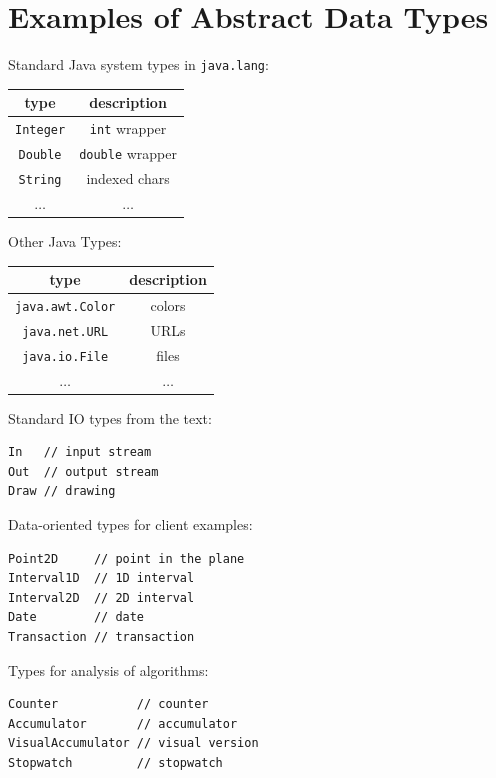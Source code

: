 \documentclass[8pt,a4paper,compress]{beamer}
\begin{document}
\section{Examples of Abstract Data Types}
\begin{frame}[fragile]
Standard Java system types in \lstinline{java.lang}:
\begin{center}
\begin{tabular}{cc}
type & description \\ \hline
\lstinline$Integer$ & \lstinline$int$ wrapper \\
\lstinline$Double$ & \lstinline$double$ wrapper \\
\lstinline$String$ & indexed chars \\
$\dots$ & $\dots$
\end{tabular} 
\end{center}

\bigskip

Other Java Types:
\begin{center}
\begin{tabular}{cc}
type & description \\ \hline
\lstinline$java.awt.Color$ & colors \\
\lstinline$java.net.URL$ & URLs \\
\lstinline$java.io.File$ & files \\
$\dots$ & $\dots$
\end{tabular} 
\end{center}

\bigskip

Standard IO types from the text:
\begin{lstlisting}[language={},mathescape]
In   // input stream
Out  // output stream
Draw // drawing
\end{lstlisting}

\bigskip

Data-oriented types for client examples:
\begin{lstlisting}[language={},mathescape]
Point2D     // point in the plane
Interval1D  // 1D interval
Interval2D  // 2D interval
Date        // date
Transaction // transaction
\end{lstlisting}

\bigskip

Types for analysis of algorithms:
\begin{lstlisting}[language={},mathescape]
Counter           // counter
Accumulator       // accumulator
VisualAccumulator // visual version
Stopwatch         // stopwatch
\end{lstlisting}
\end{frame}
\end{document}
